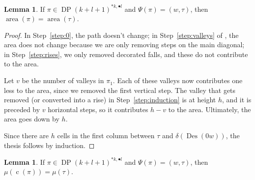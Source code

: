 \documentclass[reqno]{amsart}
\theoremstyle{plain}
\theoremstyle{definition}
\newtheorem{lemma}[theorem]{Lemma}
\theoremstyle{remark}
\DeclareMathOperator{\DP}{DP}
\DeclareMathOperator{\area}{area}
\DeclareMathOperator{\Des}{Des}
\DeclareMathOperator{\cc}{c}
\newcommand{\<}{\langle}
\renewcommand{\>}{\rangle}
\begin{document}
\begin{lemma}
    \label{lem:area}
    If $\pi \in \DP(k+l+1)^{\ast k, \bullet l}$ and $\Psi(\pi) = (w,\tau)$, then $\area(\pi) = \area(\tau)$.
\end{lemma}

\begin{proof}
    In Step~\ref{step:0}, the path doesn't change; in Step~\ref{step:valleys} of , the area does not change because we are only removing steps on the main diagonal; in Step~\ref{step:rises}, we only removed decorated falls, and these do not contribute to the area.

    Let $v$ be the number of valleys in $\pi_1$. Each of these valleys now contributes one less to the area, since we removed the first vertical step. The valley that gets removed (or converted into a rise) in Step~\ref{step:induction} is at height $h$, and it is preceded by $v$ horizontal steps, so it contributes $h-v$ to the area. Ultimately, the area goes down by $h$.

    Since there are $h$ cells in the first column between $\tau$ and $\delta(\Des(0w))$, the thesis follows by induction.
\end{proof}

\begin{lemma}
    \label{lem:comp}
    If $\pi \in \DP(k+l+1)^{\ast k, \bullet l}$ and $\Psi(\pi) = (w,\tau)$, then $\mu(\cc(\pi)) = \mu(\tau)$.
\end{lemma}
\end{document}
